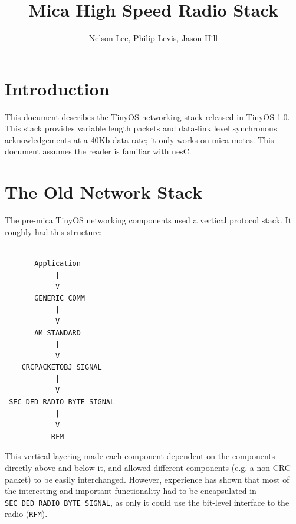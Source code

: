 \documentclass[11pt]{article}
\begin{document}
\fontsize{10}{10}                               %
\selectfont

\title{Mica High Speed Radio Stack}
\author{Nelson Lee, Philip Levis, Jason Hill}
\maketitle

\fontsize{12}{12}                               %
\selectfont

\section*{Introduction}
This document describes the TinyOS networking stack released in TinyOS
1.0. This stack provides variable length packets and data-link level
synchronous acknowledgements at a 40Kb data rate; it only works on
mica motes. This document assumes the reader is familiar with nesC.

\section*{The Old Network Stack}

The pre-mica TinyOS networking components used a vertical protocol
stack. It roughly had this structure:

\small
\begin{verbatim}

       Application
            |
            V
       GENERIC_COMM
            |
            V
       AM_STANDARD
            |
            V
    CRCPACKETOBJ_SIGNAL
            |
            V
 SEC_DED_RADIO_BYTE_SIGNAL
            |
            V
           RFM

\end{verbatim}
\normalsize

This vertical layering made each component dependent on the
components directly above and below it, and allowed different
components (e.g. a non CRC packet) to be easily interchanged. However,
experience has shown that most of the interesting and important
functionality had to be encapsulated in {\tt SEC\_DED\_RADIO\_BYTE\_SIGNAL},
as only it could use the bit-level interface to the radio ({\tt RFM}).
\end{document}
